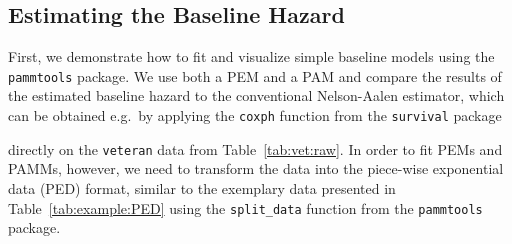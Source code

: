 \documentclass[submit]{smj}
\newcommand{\code}[1]{{\small \texttt{#1}}}
\begin{document}
\subsection{Estimating the Baseline Hazard}\label{sec:app:base}
First, we demonstrate how to fit and visualize simple baseline models using the
\code{pammtools} package. We use both a PEM and a PAM and compare the results of
the
estimated baseline hazard to the conventional Nelson-Aalen estimator, which can be
obtained e.g.\ by applying the \texttt{coxph} function from the \texttt{survival}
package

directly on the \texttt{veteran} data from Table~\ref{tab:vet:raw}. In order to
fit PEMs and PAMMs, however, we need to transform the data into the piece-wise
exponential data (PED) format, similar to the exemplary data  presented in
Table~\ref{tab:example:PED} using the \texttt{split\_data} function from the
\code{pammtools} package.
\end{document}
